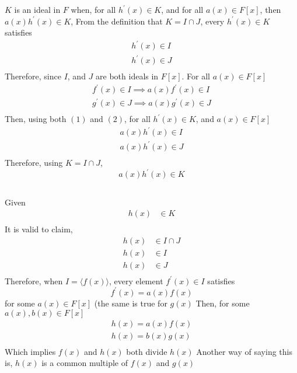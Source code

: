 \documentclass{article}
\begin{document}
\section{}
\subsection{}
$K$ is an ideal in $F$ when,
for all $h^{\prime}(x) \in K$, and
for all $a(x) \in F[x]$,
\newline
then $a(x)h^{\prime}(x) \in K$,
\newline
\newline
From the definition that $K = I \cap J$, every $h^{\prime}(x) \in K$ satisfies
\begin{equation}\label{1}
\begin{split}
h^{\prime}(x) \in I \\
h^{\prime}(x) \in J \\
\end{split}
\end{equation}
Therefore, since $I$, and $J$ are both ideals in $F[x]$.
For all $a(x) \in F[x]$
\begin{equation}\label{2}
\begin{split}
f^{\prime}(x) \in I \implies a(x)f^{\prime}(x) \in I \\
g^{\prime}(x) \in J \implies a(x)g^{\prime}(x) \in J \\
\end{split}
\end{equation}
Then, using both $(1)$ and $(2)$, for all $h^{\prime}(x) \in K$, and $a(x) \in F[x]$
\[
\begin{split}
a(x)h^{\prime}(x) \in I \\
a(x)h^{\prime}(x) \in J \\
\end{split}
\]
Therefore, using $K = I \cap J$,
\[
a(x)h^{\prime}(x) \in K
\]
\subsection{}
Given
\[
\begin{split}
h(x) &\in K \\
\end{split}
\]
It is valid to claim,
\[
\begin{split}
h(x) &\in I \cap J \\
h(x) &\in I \\
h(x) &\in J \\
\end{split}
\]
Therefore, when $I = \langle f(x) \rangle$,
every element $f^{\prime}(x) \in I$ satisfies
\[
f^{\prime}(x) = a(x)f(x)
\]
for some $a(x) \in F[x]$ (the same is true for $g(x)$
\newline
\newline
Then, for some $a(x), b(x) \in F[x]$
\[
\begin{split}
h(x) = a(x)f(x) \\
h(x) = b(x)g(x) \\
\end{split}
\]
Which implies $f(x)$ and $h(x)$ both divide $h(x)$
\newline
Another way of saying this is, $h(x)$ is a common multiple of $f(x)$ and $g(x)$
\end{document}
